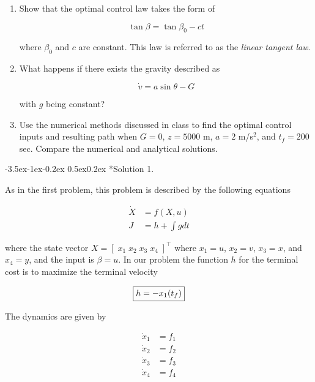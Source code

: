 \documentclass[11pt,letterpaper,onecolumn,notitlepage]{article}
\makeatletter
\renewcommand\subsection{\@startsection{subsection}{1}{\z@}%
{-3.5ex\@plus-1ex\@minus-0.2ex}%
{0.5ex\@plus0.2ex}%
{\fontsize{10pt}{10pt}\selectfont\bfseries\sffamily}}
\makeatother
\begin{document}
  \begin{enumerate}
    \item{Show that the optimal control law takes the form of}

    \begin{equation*}
      \tan\beta=\tan\beta_{0}-ct
    \end{equation*}

    where $\beta_{0}$ and $c$ are constant.
    This law is referred to as the \textit{linear tangent law}.

    \item{What happens if there exists the gravity described as}

    \begin{equation*}
    \dot{v}=a\sin\theta-G
    \end{equation*}

    with $g$ being constant?

    \item{%
      Use the numerical methods discussed in class to find the optimal control inputs and resulting path when $G=0$, $z=5000$ m, $a=2$ m/s$^2$, and $t_{f}=200$ sec.
      Compare the numerical and analytical solutions.
    }
  \end{enumerate}

  \subsection*{Solution 1.}

  As in the first problem, this problem is described by the following equations

  \begin{align*}
    \dot{X} &= f(X,u) \\
    J       &= h+\int g dt
  \end{align*}

  where the state vector $X=[\;x_{1}\;x_{2}\;x_{3}\;x_{4}\;]^{\top}$ where $x_{1}=u$, $x_{2}=v$, $x_{3}=x$, and $x_{4}=y$, and the input is $\beta=u$.
  In our problem the function $h$ for the terminal cost is to maximize the terminal velocity

  \begin{equation*}
    \boxed{%
      h=-x_{1}(t_{f})
    }
  \end{equation*}

  The dynamics are given by

  \begin{align*}
    \dot{x}_{1} &= f_{1} \\
    \dot{x}_{2} &= f_{2} \\
    \dot{x}_{3} &= f_{3} \\
    \dot{x}_{4} &= f_{4}
  \end{align*}
\end{document}
